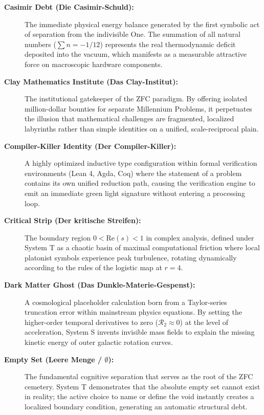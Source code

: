 \documentclass[11pt,a4paper]{article}
\begin{document}
\begin{description}
    \item[\textbf{Casimir Debt (Die Casimir-Schuld):}] The immediate physical energy balance generated by the first symbolic act of separation from the indivisible One. The summation of all natural numbers ($\sum n = -1/12$) represents the real thermodynamic deficit deposited into the vacuum, which manifests as a measurable attractive force on macroscopic hardware components.
    
    \item[\textbf{Clay Mathematics Institute (Das Clay-Institut):}] The institutional gatekeeper of the ZFC paradigm. By offering isolated million-dollar bounties for separate Millennium Problems, it perpetuates the illusion that mathematical challenges are fragmented, localized labyrinths rather than simple identities on a unified, scale-reciprocal plain.
    
    \item[\textbf{Compiler-Killer Identity (Der Compiler-Killer):}] A highly optimized inductive type configuration within formal verification environments (Lean 4, Agda, Coq) where the statement of a problem contains its own unified reduction path, causing the verification engine to emit an immediate green light signature without entering a processing loop.
    
    \item[\textbf{Critical Strip (Der kritische Streifen):}] The boundary region $0 < \text{Re}(s) < 1$ in complex analysis, defined under System T as a chaotic basin of maximal computational friction where local platonist symbols experience peak turbulence, rotating dynamically according to the rules of the logistic map at $r=4$.
    
    \item[\textbf{Dark Matter Ghost (Das Dunkle-Materie-Gespenst):}] A cosmological placeholder calculation born from a Taylor-series truncation error within mainstream physics equations. By setting the higher-order temporal derivatives to zero ($\mathcal{R}_2 \approx 0$) at the level of acceleration, System S invents invisible mass fields to explain the missing kinetic energy of outer galactic rotation curves.
    
    \item[\textbf{Empty Set (Leere Menge / $\emptyset$):}] The fundamental cognitive separation that serves as the root of the ZFC cemetery. System T demonstrates that the absolute empty set cannot exist in reality; the active choice to name or define the void instantly creates a localized boundary condition, generating an automatic structural debt.
    

\end{description}
\end{document}

